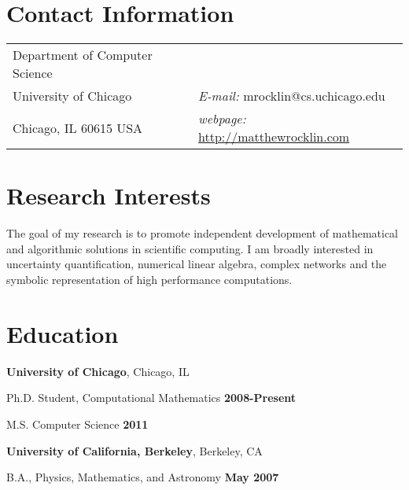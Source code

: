 \documentclass[margin,line]{res}
\newenvironment{list1}{
  \begin{list}{\ding{113}}{%
      \setlength{\itemsep}{0in}
      \setlength{\parsep}{0in} \setlength{\parskip}{0in}
      \setlength{\topsep}{0in} \setlength{\partopsep}{0in} 
      \setlength{\leftmargin}{0.17in}}}{\end{list}}
\begin{document}
\newcommand{\link}[1]{\texttt{#1}}


\begin{resume}
\section{\sc Contact Information}
\vspace{.05in}
\begin{tabular}{@{}p{2in}p{4in}}
Department of Computer Science   &         \\ 
University of Chicago & {\it E-mail:}  mrocklin@cs.uchicago.edu\\       
Chicago, IL  60615 USA  & {\it webpage:} \href{http://matthewrocklin.com}{http://matthewrocklin.com} \\
\end{tabular}


\section{\sc Research Interests}

The goal of my research is to promote independent development of mathematical and algorithmic solutions in scientific computing. I am broadly interested in uncertainty quantification, numerical linear algebra, complex networks and the symbolic representation of high performance computations. 

\section{\sc Education}
{\bf University of Chicago}, Chicago, IL\\
\vspace*{-.1in}
\begin{list1}
\item[] Ph.D. Student, Computational Mathematics \hfill {\bf 2008-Present}
\item[] M.S. Computer Science \hfill {\bf 2011}
\end{list1}

{\bf University of California, Berkeley}, Berkeley, CA\\
\vspace*{-.1in}
\begin{list1}
\item[] B.A., Physics, Mathematics, and Astronomy \hfill {\bf May 2007}
\end{list1}


\end{resume}
\end{document}
